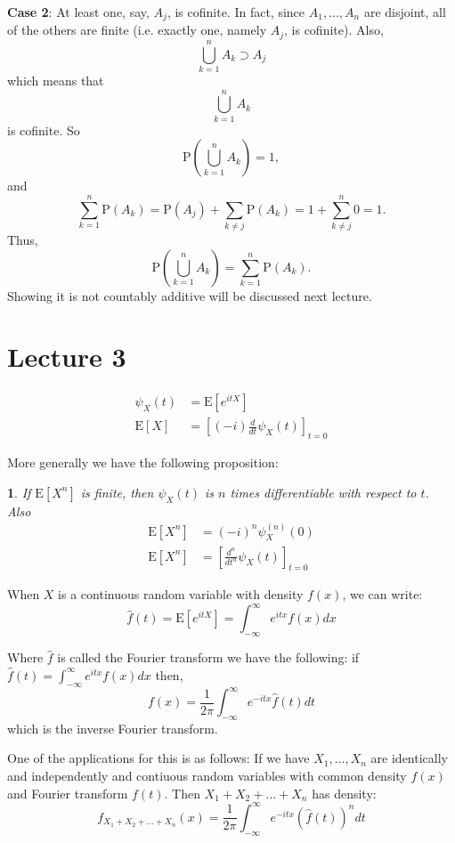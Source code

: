 \documentclass[english,12pt]{article}
\theoremstyle{plain}
\newtheorem*{proposition}{\protect\propositionname}
\theoremstyle{definition}
\theoremstyle{definition} %
\newcommand{\prop}[1]{\begin{proposition} #1 \end{proposition} }
\providecommand{\propositionname}{Proposition}
\newcommand{\ex}[1]{\mbox{E} \left[ #1 \right]}
\begin{document}
\textbf{Case 2}: At least one, say, $A_j$, is cofinite. In fact, since $A_1, \ldots, A_n$ are disjoint, all of the others are finite (i.e. exactly one, namely $A_j$, is cofinite). Also,
\[ \bigcup_{k=1}^n A_k \supset A_j \]
which means that
\[ \bigcup_{k=1}^n A_k \]
is cofinite. So
\[ \text{P} \left( \bigcup_{k=1}^n A_k \right) = 1, \]
and
\[ \sum_{k=1}^n \text{P}(A_k) = \text{P}(A_j) + \sum_{k \neq j} \text{P}(A_k) = 1 + \sum_{k\neq j}^n 0 = 1. \]
Thus,
\[ \text{P} \left( \bigcup_{k=1}^n A_k \right) = \sum_{k=1}^n \text{P}(A_k). \]
Showing it is not countably additive will be discussed next lecture.

\section*{Lecture 3}
\begin{align*}
\psi_X(t)&=\ex{e^{itX}}\\
\ex{X}&=\left[(-i)\frac{d}{dt}\psi_X(t)\right]_{t=0}
\end{align*}

More generally we have the following proposition:
\prop{
If $\ex{X^n}$ is finite, then $\psi_X(t)$ is $n$ times differentiable with respect to $t$.  Also
\begin{align*}
\ex{X^n}&=(-i)^n\psi_X^{(n)}(0)\\
\ex{X^n}&=\left[\frac{d^n}{dt^n}\psi_X(t)\right]_{t=0}
\end{align*}
}

When $X$ is a continuous random variable with density $f(x)$, we can write:
\[\hat{f}(t)=\ex{e^{itX}}=\int_{-\infty}^\infty e^{itx}f(x)dx\]

Where $\hat{f}$ is called the Fourier transform we have the following:
if $\hat{f}(t)=\int_{-\infty}^\infty e^{itx}f(x)dx$ then,
\[f(x)=\frac{1}{2\pi}\int_{-\infty}^\infty e^{-itx}\hat{f}(t)dt\]
which is the inverse Fourier transform.

One of the applications for this is as follows:
If we have $X_1,\ldots,X_n$ are identically and independently and contiuous random variables with common density $f(x)$ and Fourier transform $f(t)$.  Then $X_1+X_2+\ldots+X_n$ has density:
\[f_{X_1+X_2+\ldots+X_n}(x)=\frac{1}{2\pi}\int_{-\infty}^\infty e^{-itx}(\hat{f}(t))^ndt\]
\end{document}
